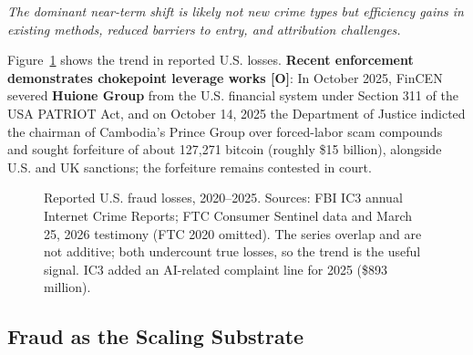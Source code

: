 \documentclass[11pt,letterpaper]{article}
\begin{document}
\begin{infobox}
\textit{The dominant near-term shift is likely not new crime types but efficiency gains in existing methods, reduced barriers to entry, and attribution challenges.}

Figure~\ref{fig:fraudtrend} shows the trend in reported U.S. losses. \textbf{Recent enforcement demonstrates chokepoint leverage works [O]}: In October 2025, FinCEN severed \textbf{Huione Group} from the U.S. financial system under Section 311 of the USA PATRIOT Act, and on October 14, 2025 the Department of Justice indicted the chairman of Cambodia's Prince Group over forced-labor scam compounds and sought forfeiture of about 127,271 bitcoin (roughly \$15 billion), alongside U.S. and UK sanctions; the forfeiture remains contested in court.
\end{infobox}

\begin{figure}[htbp]
\centering
{}
\caption{Reported U.S. fraud losses, 2020--2025. Sources: FBI IC3 annual Internet Crime Reports; FTC Consumer Sentinel data and March 25, 2026 testimony (FTC 2020 omitted). The series overlap and are not additive; both undercount true losses, so the trend is the useful signal. IC3 added an AI-related complaint line for 2025 (\$893 million).}
\label{fig:fraudtrend}
\end{figure}

\subsection{Fraud as the Scaling Substrate}
\end{document}
